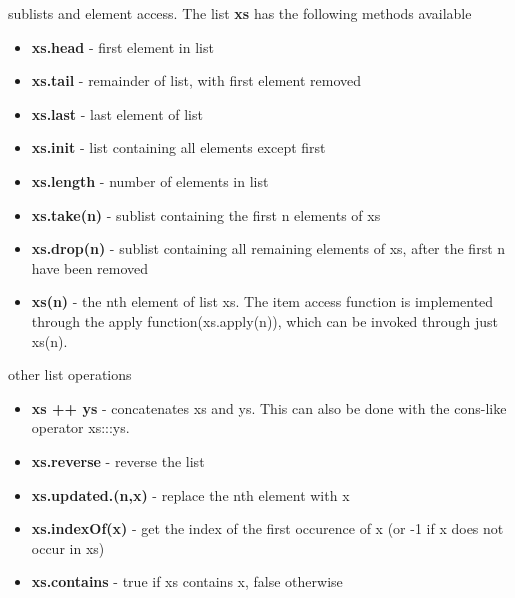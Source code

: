 sublists and element access. The list \textbf{xs} has the following methods available
\begin{itemize}
  \item \textbf{xs.head} - first element in list
  \item \textbf{xs.tail} - remainder of list, with first element removed
  \item \textbf{xs.last} - last element of list
  \item \textbf{xs.init} - list containing all elements except first
  \item \textbf{xs.length} - number of elements in list
  \item \textbf{xs.take(n)} - sublist containing the first n elements of xs
  \item \textbf{xs.drop(n)} - sublist containing all remaining elements of xs, after the first n have been removed
  \item \textbf{xs(n)} - the nth element of list xs. The item access function is implemented through the apply function(xs.apply(n)), which can be invoked through just xs(n). 
\end{itemize}
other list operations
\begin{itemize}
  \item \textbf{xs ++ ys} - concatenates xs and ys. This can also be done with the cons-like operator xs:::ys.
  \item \textbf{xs.reverse} - reverse the list
  \item \textbf{xs.updated.(n,x)} - replace the nth element with x
  \item \textbf{xs.indexOf(x)} - get the index of the first occurence of x (or -1 if x does not occur in xs)
  \item \textbf{xs.contains} - true if xs contains x, false otherwise
\end{itemize}











